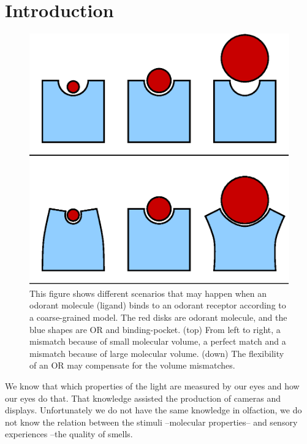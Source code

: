 \documentclass[fleqn,10pt]{wlscirep} %
\begin{document}
\section*{Introduction}
\begin{figure}
	\centering
	\includegraphics[width=0.4 \textwidth]{binding-pocket-size-flex}
	\caption{This figure shows different scenarios that may happen when an odorant molecule (ligand) binds to an odorant receptor according to a coarse-grained model. 
		The red disks  are odorant molecule, 
		and the blue shapes are OR and binding-pocket.	
		(top) From left to right, a mismatch because of small molecular volume, 
		a perfect match and a mismatch because of large molecular volume.
		(down) The flexibility of an OR may compensate for the volume mismatches.
		}
	\label{fig:binding-pocket}
\end{figure}


We know that which properties of the light are measured by our eyes and how our eyes do that. 
That knowledge assisted the production of cameras and displays. 
Unfortunately we do not have the same knowledge in olfaction, 
we do not know the relation between the stimuli --molecular properties-- and sensory experiences --the quality of smells.  

\end{document}
